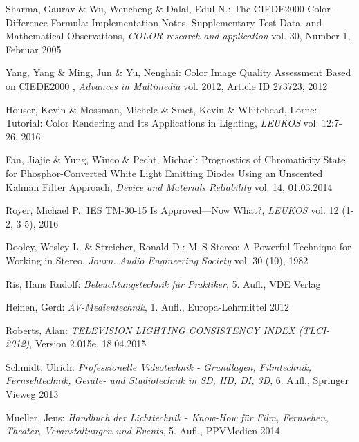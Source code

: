 \begin{thebibliography}{}
Sharma, Gaurav \& Wu, Wencheng \& Dalal, Edul N.:
\glqq The CIEDE2000 Color-Difference Formula: Implementation Notes, Supplementary Test Data, and Mathematical Observations\grqq,
\emph{COLOR research and application} vol. 30, Number 1, Februar 2005

Yang, Yang \& Ming, Jun \& Yu, Nenghai:
\glqq Color Image Quality Assessment Based on CIEDE2000 \grqq,
\emph{Advances in Multimedia} vol. 2012, Article ID 273723, 2012

Houser, Kevin \& Mossman, Michele \& Smet, Kevin \& Whitehead, Lorne:
\glqq Tutorial: Color Rendering and Its Applications in
Lighting\grqq, 
\emph{LEUKOS} vol. 12:7-26, 2016

Fan, Jiajie \& Yung, Winco \& Pecht, Michael:
\glqq Prognostics of Chromaticity State for Phosphor-Converted White Light Emitting Diodes Using an Unscented Kalman Filter Approach\grqq, 
\emph{Device and Materials Reliability} vol. 14, 01.03.2014

Royer, Michael P.:
\glqq IES TM-30-15 Is Approved—Now What?\grqq, 
\emph{LEUKOS} vol. 12 (1-2, 3-5), 2016


Dooley, Wesley L.  \& Streicher, Ronald D.:
\glqq M--S Stereo: A Powerful Technique for Working in Stereo\grqq, 
\emph{Journ. Audio Engineering Society} vol. 30 (10), 1982

Ris, Hans Rudolf: 
\emph{Beleuchtungstechnik für Praktiker}, 5. Aufl., VDE Verlag

Heinen, Gerd: 
\emph{AV-Medientechnik}, 1. Aufl., Europa-Lehrmittel 2012

Roberts, Alan: 
\emph{TELEVISION LIGHTING CONSISTENCY INDEX (TLCI-2012)}, Version 2.015e, 18.04.2015

Schmidt, Ulrich: 
\emph{Professionelle Videotechnik - Grundlagen, Filmtechnik, Fernsehtechnik, Geräte- und Studiotechnik in SD, HD, DI, 3D}, 6. Aufl., Springer Vieweg 2013

Mueller, Jens: 
\emph{Handbuch der Lichttechnik - Know-How für Film, Fernsehen, Theater, Veranstaltungen und Events}, 5. Aufl., PPVMedien 2014
 

\end{thebibliography}
